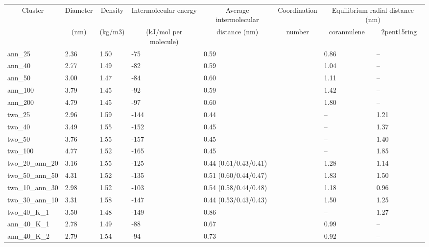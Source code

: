 \begin{table}[]
\begin{tabular}{l|l|l|l|l|l|ll}
\hline
\multicolumn{1}{c|}{\multirow{2}{*}{Cluster}} & \multicolumn{1}{c|}{Diameter} & \multicolumn{1}{c|}{Density} & \multicolumn{1}{c|}{Intermolecular energy} & \multicolumn{1}{c|}{Average intermolecular} & \multicolumn{1}{c|}{Coordination} & \multicolumn{2}{c}{Equilibrium radial distance (nm)} \\ \cline{7-8} 
\multicolumn{1}{c|}{} & \multicolumn{1}{c|}{(nm)} & \multicolumn{1}{c|}{(kg/m3)} & \multicolumn{1}{c|}{(kJ/mol per molecule)} & \multicolumn{1}{c|}{distance (nm)} & \multicolumn{1}{c|}{number} & \multicolumn{1}{c|}{corannulene} & \multicolumn{1}{c}{2pent15ring} \\ \hline
ann\_25 & 2.36 & 1.50 & -75 & 0.59 &  & \multicolumn{1}{l|}{0.86} & -- \\
ann\_40 & 2.77 & 1.49 & -82 & 0.59 &  & \multicolumn{1}{l|}{1.04} & -- \\
ann\_50 & 3.00 & 1.47 & -84 & 0.60 &  & \multicolumn{1}{l|}{1.11} & -- \\
ann\_100 & 3.79 & 1.45 & -92 & 0.59 &  & \multicolumn{1}{l|}{1.42} & -- \\
ann\_200 & 4.79 & 1.45 & -97 & 0.60 &  & \multicolumn{1}{l|}{1.80} & -- \\
two\_25 & 2.96 & 1.59 & -144 & 0.44 &  & \multicolumn{1}{l|}{--} & 1.21 \\
two\_40 & 3.49 & 1.55 & -152 & 0.45 &  & \multicolumn{1}{l|}{--} & 1.37 \\
two\_50 & 3.76 & 1.55 & -157 & 0.45 &  & \multicolumn{1}{l|}{--} & 1.40 \\
two\_100 & 4.77 & 1.52 & -165 & 0.45 &  & \multicolumn{1}{l|}{--} & 1.85 \\
two\_20\_ann\_20 & 3.16 & 1.55 & -125 & 0.44 (0.61/0.43/0.41) &  & \multicolumn{1}{l|}{1.28} & 1.14 \\
two\_50\_ann\_50 & 4.31 & 1.52 & -135 & 0.51 (0.60/0.44/0.47) &  & \multicolumn{1}{l|}{1.83} & 1.50 \\
two\_10\_ann\_30 & 2.98 & 1.52 & -103 & 0.54 (0.58/0.44/0.48) &  & \multicolumn{1}{l|}{1.18} & 0.96 \\
two\_30\_ann\_10 & 3.31 & 1.58 & -147 & 0.44 (0.53/0.43/0.43) &  & \multicolumn{1}{l|}{1.50} & 1.25 \\
two\_40\_K\_1 & 3.50 & 1.48 & -149 & 0.86 &  & \multicolumn{1}{l|}{--} & 1.27 \\
ann\_40\_K\_1 & 2.78 & 1.49 & -88 & 0.67 &  & \multicolumn{1}{l|}{0.99} & -- \\
ann\_40\_K\_2 & 2.79 & 1.54 & -94 & 0.73 &  & \multicolumn{1}{l|}{0.92} & -- \\ \hline
\end{tabular}
\end{table}
